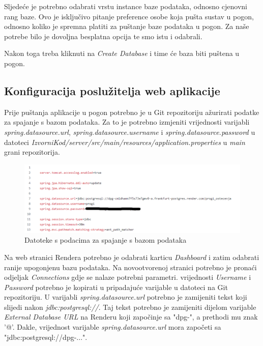 			Sljedeće je potrebno odabrati vrstu instance baze podataka, odnosno cjenovni rang baze. Ovo je isključivo pitanje preference osobe koja pušta sustav u pogon, odnosno koliko je spremna platiti za puštanje baze podataka u pogon. Za naše potrebe bilo je dovoljna besplatna opcija te smo istu i odabrali.
			
			Nakon toga treba kliknuti na \textit{Create Database} i time će baza biti puštena u pogon.
			
			\subsection{Konfiguracija poslužitelja web aplikacije}
			
			Prije puštanja aplikacije u pogon potrebno je u Git repozitoriju ažurirati podatke za spajanje s bazom podataka. Za to je potrebno izmjeniti vrijednosti varijabli \textit{spring.datasource.url}, \textit{spring.datasource.username} i \textit{spring.datasource.password} u datoteci \textit{IzvorniKod/server/src/main/resources/application.properties} u \textit{main} grani repozitorija. 
			
			\begin{figure}[H]
				\includegraphics[width=\textwidth]{slike/upute/applicationProperties.png} %
				\caption{Datoteke s podacima za spajanje s bazom podataka}
				\label{fig:applicationProperties} %
			\end{figure}
			
			Na web stranici Rendera potrebno je odabrati karticu \textit{Dashboard} i zatim odabrati ranije upogonjenu bazu podataka. Na novootvorenoj stranici potrebno je pronaći odjeljak \textit{Connections} gdje se nalaze potrebni parametri. vrijednosti \textit{Username} i \textit{Password} potrebno je kopirati u pripadajuće varijable u datoteci na Git repozitoriju. U varijabli \textit{spring.datasource.url} potrebno je zamijeniti tekst koji slijedi nakon \textit{jdbc:postgresql://}. Taj tekst potrebno je zamijeniti dijelom varijable \textit{External Database URL} na Renderu koji započinje sa "dpg-", a prethodi mu znak '@'. Dakle, vrijednost varijable \textit{spring.datasource.url} mora započeti sa "jdbc:postgresql://dpg-...".
			
